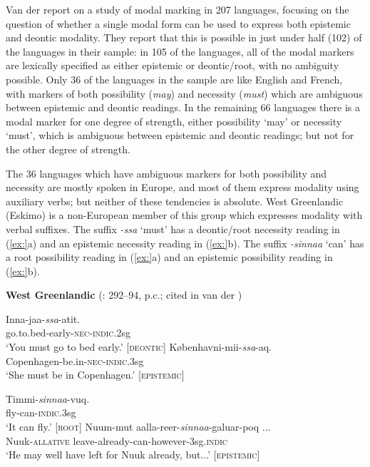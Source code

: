 Van der \citet{AuweraAmmann2013} report on a study of modal marking in 207 languages, focusing on the question of whether a single modal form can be used to express both epistemic and deontic modality. They report that this is possible in just under half (102) of the languages in their sample: in 105 of the languages, all of the modal markers are lexically specified as either epistemic or deontic/root, with no ambiguity possible. Only 36 of the languages in the sample are like English and French, with markers of both possibility (\textit{may}) and necessity (\textit{must}) which are ambiguous between epistemic and deontic readings. In the remaining 66 languages there is a modal marker for one degree of strength, either possibility ‘may’ or necessity ‘must’, which is ambiguous between epistemic and deontic readings; but not for the other degree of strength.



The 36 languages which have ambiguous markers for both possibility and necessity are mostly spoken in Europe, and most of them express modality using auxiliary verbs; but neither of these tendencies is absolute. West Greenlandic (Eskimo) is a non-European member of this group which expresses modality with verbal suffixes. The suffix \textit{-ssa} ‘must’ has a deontic/root necessity reading in (\ref{ex:}a) and an epistemic necessity reading in (\ref{ex:}b). The suffix \textit{-sinnaa} ‘can’ has a root possibility reading in (\ref{ex:}a) and an epistemic possibility reading in (\ref{ex:}b).


\textbf{West Greenlandic} (\citealt{Fortescue1984}: 292–94, p.c.; cited in van der \citealt{AuweraAmmann2013}) 

\ea
\ea \gll Inna-jaa-\textit{ssa}-atit.\\
go.to.bed-early-\textsc{nec-indic}.2sg\\
\glt ‘You must go to bed early.’  [\textsc{deontic}]
\ex \gll Københavni-mii-\textit{ssa}-aq.\\
Copenhagen-be.in-\textsc{nec-indic}.3sg\\
\glt ‘She must be in Copenhagen.’  [\textsc{epistemic}]
\z \z

\ea \gll Timmi-\textit{sinnaa}-vuq.\\
fly-can-\textsc{indic}.3sg\\
\glt ‘It can fly.’  [\textsc{root}]
\ex \gll  Nuum-mut  aalla-reer-\textit{sinnaa}-galuar-poq ...\\
Nuuk-\textsc{allative}  leave-already-can-however-3sg.\textsc{indic}\\
\glt ‘He may well have left for Nuuk already, but...’  [\textsc{epistemic}]
\z



